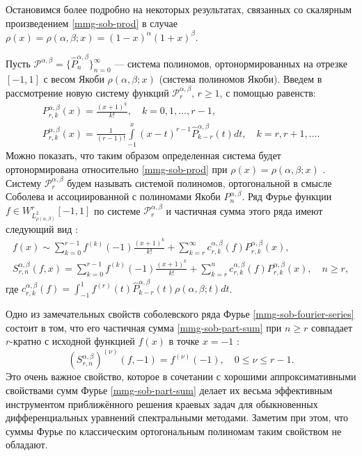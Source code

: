 Остановимся более подробно на некоторых результатах, связанных со скалярным произведением \eqref{mmg-sob-prod} в случае $\rho(x)=\rho(\alpha,\beta; x)=(1-x)^\alpha(1+x)^\beta$.

Пусть $\mathcal{P}^{\alpha,\beta}=\{ \hat{P}_n^{\alpha,\beta} \}_{n=0}^\infty$ --- система полиномов, ортонормированных на отрезке $[-1,1]$ с весом Якоби $\rho(\alpha,\beta; x)$ (система полиномов Якоби). Введем в рассмотрение новую систему функций $\mathcal{P}^{\alpha,\beta}_r$, $r \ge 1$, с помощью равенств:
\begin{gather}
	\label{mmg-sob-def1}
	P_{r,k}^{\alpha,\beta}(x) =\frac{(x+1)^k}{k!}, \quad k=0,1,\ldots, r-1,\\
	\label{mmg-sob-def2}
	P_{r,k}^{\alpha,\beta}(x) =\frac{1}{(r-1)!}\int\limits_{-1}^x(x-t)^{r-1}\hat{P}_{k-r}^{\alpha,\beta}(t)dt, \quad k=r,r+1,\ldots.
\end{gather}
Можно показать, что таким образом определенная система будет ортонормирована относительно \eqref{mmg-sob-prod} при $\rho(x)=\rho(\alpha,\beta; x)$ \cite[с.~231]{mmg-Shii-izvran2018}. Систему $\mathcal{P}_r^{\alpha,\beta}$ будем называть системой полиномов, ортогональной в смысле Соболева и ассоциированной с полиномами Якоби $P_n^{\alpha,\beta}$.
Ряд Фурье функции $f \in W^r_{L^2_{\rho(\alpha,\beta)}}[-1,1]$ по системе $\mathcal{P}_r^{\alpha,\beta}$ и частичная сумма этого ряда имеют следующий вид \cite[с.~227]{mmg-Shii-izvran2018}:
\begin{gather}
	\label{mmg-sob-fourier-series}
	f(x) \sim \sum_{k=0}^{r-1} f^{(k)}(-1)\frac{(x+1)^k}{k!}+ \sum_{k=r}^\infty c^{\alpha,\beta}_{r,k}(f) P_{r,k}^{\alpha,\beta}(x),\\
	\label{mmg-sob-part-sum}
	S^{\alpha,\beta}_{r,n}(f,x) = \sum_{k=0}^{r-1} f^{(k)}(-1)\frac{(x+1)^k}{k!}+ \sum_{k=r}^n c^{\alpha,\beta}_{r,k}(f) P_{r,k}^{\alpha,\beta}(x), \quad n \ge r,
\end{gather}
где $c^{\alpha,\beta}_{r,k}(f)=\int_{-1}^1 f^{(r)}(t)\hat{P}_{k-r}^{\alpha,\beta}(t)\rho(\alpha,\beta; t)dt$.

Одно из замечательных свойств соболевского ряда Фурье \eqref{mmg-sob-fourier-series} состоит в том, что его частичная сумма \eqref{mmg-sob-part-sum} при $n \ge r$ совпадает $r$-кратно с исходной функцией $f(x)$ в точке $x=-1$ \cite[с. 228]{mmg-Shii-izvran2018}:
\begin{equation}\label{mmg-sob-part-sum-coins}
	(S^{\alpha,\beta}_{r,n})^{(\nu)}(f,-1)=f^{(\nu)}(-1), \quad 0\le\nu\le r-1.
\end{equation}
Это очень важное свойство, которое в сочетании с хорошими аппроксимативными свойствами сумм Фурье \eqref{mmg-sob-part-sum}
делает их весьма эффективным инструментом приближённого решения краевых задач для обыкновенных дифференциальных уравнений спектральными методами. Заметим при этом, что суммы Фурье по классическим ортогональным полиномам таким свойством не обладают.

